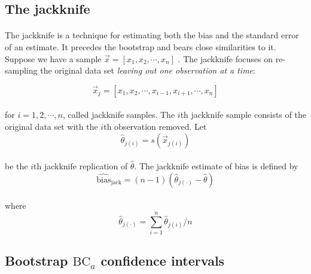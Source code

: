 \documentclass[letterpaper]{article}
\begin{document}
\FloatBarrier

\subsection*{The jackknife}
\paragraph{}
The jackknife is a technique for estimating both the bias and the standard error of an estimate. It precedes the bootstrap and bears close similarities to it. Suppose we have a sample $\vec{x}=[x_{1},x_{2},\cdots,x_{n}]$ . The jackknife focuses on re-sampling the original data set \textit{leaving out one observation at a time}:

\begin{equation}
    \vec{x}_j=[x_1,x_2,\cdots,x_{i-1},x_{i+1},\cdots,x_n]
\end{equation}

\paragraph{}
for $i=1,2,\cdots,n$, called jackknife samples. The $i$th jackknife sample consists of the original data set with the $i$th observation removed. Let 
\begin{equation}
    \hat{\theta}_{j(i)}=s(\vec{x}_{j(i)})
\end{equation}
\paragraph{}
be the $i$th jackknife replication of $\hat{\theta}$. The jackknife estimate of bias is defined by
\begin{equation}
    \hat{\mathrm{bias}}_\mathrm{jack}=(n-1)(\hat{\theta}_{j(\cdot)}-\hat{\theta})
\end{equation}
\paragraph{}
where
\begin{equation}
    \hat{\theta}_{j(\cdot)}=\sum_{i=1}^{n}\hat{\theta}_{j(i)}/n
\end{equation}

\FloatBarrier

\subsection*{Bootstrap $\mathrm{BC}_a$ confidence intervals}
\end{document}
